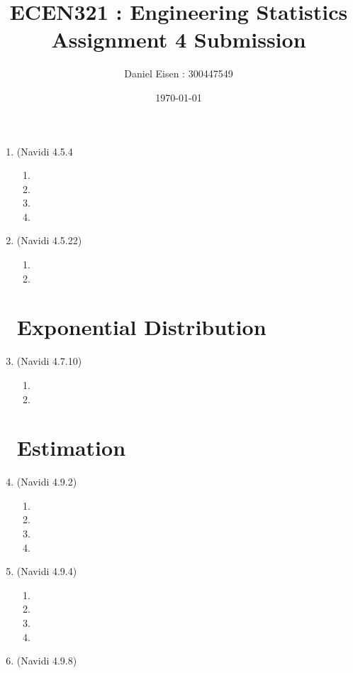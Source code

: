 \documentclass[11pt]{article}
\title{ECEN321 : Engineering Statistics \\ Assignment 4 Submission}
\author{Daniel Eisen : 300447549}
\date{\today}
\begin{document}
\begin{preview}

\maketitle
\begin{enumerate}
\section*{Normal Distribution}
\item (Navidi 4.5.4
\begin{enumerate}
        \item 
        \item 
        \item 
        \item 
\end{enumerate}
\item (Navidi 4.5.22)
\begin{enumerate}
        \item 
        \item 
\end{enumerate}

\section*{Exponential Distribution}
\item (Navidi 4.7.10)
\begin{enumerate}
        \item 
        \item 
\end{enumerate}

\section*{Estimation}
\item (Navidi 4.9.2) 
\begin{enumerate}
        \item 
        \item 
        \item 
        \item 
\end{enumerate}
\item (Navidi 4.9.4)
\begin{enumerate}
        \item 
        \item 
        \item 
        \item 
\end{enumerate}
\item (Navidi 4.9.8)

\end{enumerate}
\end{preview}
\end{document}
